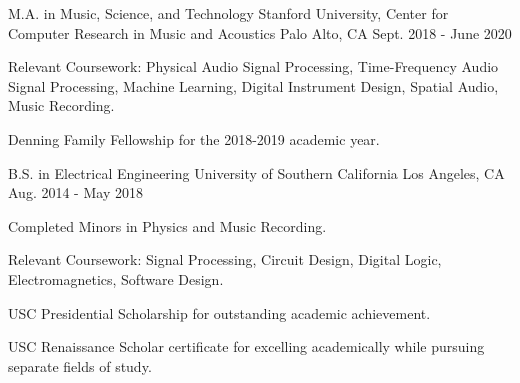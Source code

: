 

\begin{cventries}

    \cventry
    {M.A. in Music, Science, and Technology} %
    {Stanford University, Center for Computer Research in Music and Acoustics} %
    {Palo Alto, CA} %
    {Sept. 2018 - June 2020} %
    {
      \begin{cvitems} %
        \item {Relevant Coursework: Physical Audio Signal Processing, Time-Frequency Audio Signal Processing,
        Machine Learning, Digital Instrument Design, Spatial Audio, Music Recording.}
        \item {Denning Family Fellowship for the 2018-2019 academic year.}
      \end{cvitems}
    }

    \cventry
    {B.S. in Electrical Engineering} %
    {University of Southern California} %
    {Los Angeles, CA} %
    {Aug. 2014 - May 2018} %
    {
      \begin{cvitems} %
        \item {Completed Minors in Physics and Music Recording.}
        \item {Relevant Coursework: Signal Processing, Circuit Design, Digital Logic, Electromagnetics, Software Design.}
        \item {USC Presidential Scholarship for outstanding academic achievement.}
        \item {USC Renaissance Scholar certificate for excelling academically while pursuing separate fields of study.}
      \end{cvitems}
    }

\end{cventries}
